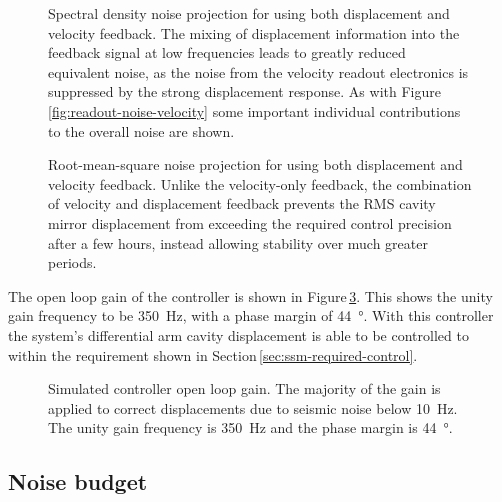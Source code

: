 \begin{figure}
  \centering
  
  \caption[Spectral density noise projection for \LMINUS{} using both displacement and velocity feedback]{\label{fig:readout-noise-mixed}Spectral density noise projection for \LMINUS{} using both displacement and velocity feedback. The mixing of displacement information into the feedback signal at low frequencies leads to greatly reduced equivalent \LMINUS{} noise, as the noise from the velocity readout electronics is suppressed by the strong displacement response. As with Figure\,\ref{fig:readout-noise-velocity} some important individual contributions to the overall noise are shown.}
\end{figure}

\begin{figure}
  \centering
  
  \caption[Root-mean-square noise projection for \LMINUS{} using both displacement and velocity feedback]{\label{fig:readout-noise-mixed-rms}Root-mean-square noise projection for \LMINUS{} using both displacement and velocity feedback. Unlike the velocity-only feedback, the combination of velocity and displacement feedback prevents the \gls{RMS} cavity mirror displacement from exceeding the required control precision after a few hours, instead allowing stability over much greater periods.}
\end{figure}

The open loop gain of the controller is shown in Figure\,\ref{fig:open-loop-gain}. This shows the unity gain frequency to be \SI{350}{\hertz}, with a phase margin of \SI{44}{\degree}. With this controller the system's differential arm cavity displacement is able to be controlled to within the requirement shown in Section\,\ref{sec:ssm-required-control}.

\begin{figure}
  
  \caption[Simulated controller open loop gain]{\label{fig:open-loop-gain}Simulated \SSM{} controller open loop gain. The majority of the gain is applied to correct displacements due to seismic noise below \SI{10}{\hertz}. The unity gain frequency is \SI{350}{\hertz} and the phase margin is \SI{44}{\degree}.}
\end{figure}

\subsection{\label{sec:noise-budget}Noise budget}

